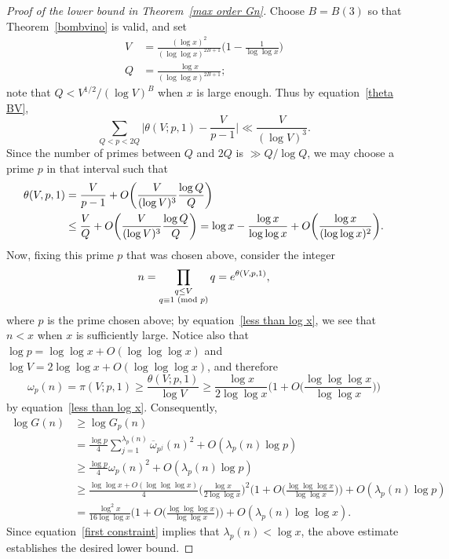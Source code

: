 \documentclass[12pt,reqno]{amsart}
\theoremstyle{definition}
\renewcommand{\mod}[1]{{\ifmmode\text{\rm\ (mod~$#1$)}\else\discretionary{}{}{\hbox{ }}\rm(mod~$#1$)\fi}}
\newcommand{\ovomega}{{\overline\omega}}
\begin{document}
\begin{proof}[Proof of the lower bound in Theorem~\ref{max order Gn}]
Choose $B=B(3)$ so that Theorem~\ref{bombvino} is valid, and set
\begin{align*}
V &= \frac{(\log x)^2}{(\log\log x)^{2B+1}} \bigg( 1 - \frac1{\log\log x} \bigg) \\
Q &= \frac{\log x}{(\log\log x)^{2B+1}};
\end{align*}
note that $Q < V^{1/2}/(\log V)^B$ when $x$ is large enough.
Thus by equation~\eqref{theta BV},
\[
\sum_{Q < p < 2Q} \bigg|\theta(V; p, 1) - \frac V{p-1}\bigg| \ll \frac{V}{(\log V)^3}.
\]
Since the number of primes between $Q$ and $2Q$ is $\gg Q/\log Q$, we may choose a prime $p$ in that interval such that
\begin{align}
\theta(V, p, 1) &= \frac V{p-1} + O\bigg( \frac{V}{(\log V)^3} \frac{\log Q}Q \bigg) \notag \\
&\le \frac VQ + O\bigg( \frac{V}{(\log V)^3} \frac{\log Q}Q \bigg) = \log x - \frac{\log x}{\log\log x} + O\bigg( \frac{\log x}{(\log\log x)^2} \bigg).
\label{less than log x}
\end{align}
Now, fixing this prime $p$ that was chosen above, consider the integer
\[
n = \prod_{\substack{q \le V \\ q \equiv 1 \mod p}} q = e^{\theta(V, p, 1)},
\]
where $p$ is the prime chosen above; by equation~\eqref{less than log x}, we see that $n<x$ when $x$ is sufficiently large. Notice also that $\log p = \log\log x + O(\log\log\log x)$ and $\log V = 2\log\log x + O(\log\log\log x)$, and therefore
\[
\omega_p(n) = \pi(V;p,1) \ge \frac{\theta(V;p,1)}{\log V} \ge \frac{\log x}{2\log\log x} \bigg( 1 + O\bigg( \frac{\log\log\log x}{\log\log x} \bigg) \bigg)
\]
by equation~\eqref{less than log x}. Consequently,
\begin{align*}
\log G(n) &\ge \log G_p(n) \\
&= \frac{\log p}{4} \sum_{j = 1}^{\lambda_p(n)} \ovomega_{p^j}(n)^2 + O(\lambda_p(n) \log p) \\
&\ge \frac{\log p}{4} \omega_{p}(n)^2 + O(\lambda_p(n) \log p) \\
&\ge \frac{\log\log x + O(\log\log\log x)}{4} \bigg( \frac{\log x}{2\log\log x} \bigg)^2 \bigg( 1 + O\bigg( \frac{\log\log\log x}{\log\log x} \bigg) \bigg) + O(\lambda_p(n) \log p) \\
&= \frac{\log^2 x}{16\log\log x} \bigg( 1 + O\bigg( \frac{\log\log\log x}{\log\log x} \bigg) \bigg) + O(\lambda_p(n) \log\log x).
\end{align*}
Since equation~\eqref{first constraint} implies that $\lambda_p(n) < \log x$, the above estimate establishes the desired lower bound.
\end{proof}
\end{document}
